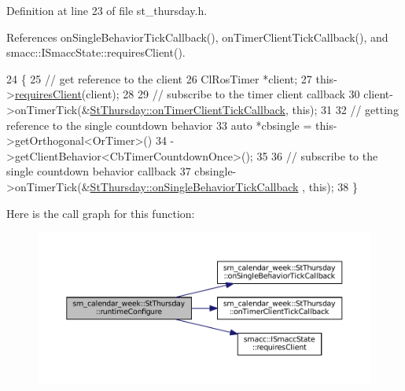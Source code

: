 Definition at line 23 of file st\+\_\+thursday.\+h.



References on\+Single\+Behavior\+Tick\+Callback(), on\+Timer\+Client\+Tick\+Callback(), and smacc\+::\+I\+Smacc\+State\+::requires\+Client().


\begin{DoxyCode}
24     \{
25         \textcolor{comment}{// get reference to the client}
26         ClRosTimer *client;
27         this->\hyperlink{classsmacc_1_1ISmaccState_a7f95c9f0a6ea2d6f18d1aec0519de4ac}{requiresClient}(client);
28 
29         \textcolor{comment}{// subscribe to the timer client callback}
30         client->onTimerTick(&\hyperlink{structsm__calendar__week_1_1StThursday_a70c4950d616a99cb68239fd9791e5c42}{StThursday::onTimerClientTickCallback}, \textcolor{keyword}{
      this});
31 
32         \textcolor{comment}{// getting reference to the single countdown behavior}
33         \textcolor{keyword}{auto} *cbsingle = this->getOrthogonal<OrTimer>()
34                              ->getClientBehavior<CbTimerCountdownOnce>();
35 
36         \textcolor{comment}{// subscribe to the single countdown behavior callback}
37         cbsingle->onTimerTick(&\hyperlink{structsm__calendar__week_1_1StThursday_a747d5d697bf66b1424b1b2fafcfdbcba}{StThursday::onSingleBehaviorTickCallback}
      , \textcolor{keyword}{this});
38     \}
\end{DoxyCode}
Here is the call graph for this function\+:
\nopagebreak
\begin{figure}[H]
\begin{center}
\leavevmode
\includegraphics[width=350pt]{structsm__calendar__week_1_1StThursday_a39b3ce105c15a814a3f4a01ad439ceb3_cgraph}
\end{center}
\end{figure}
\mbox{\label{structsm__calendar__week_1_1StThursday_ace087bef31c63fa8e67bd835a46b6a6f}} 

